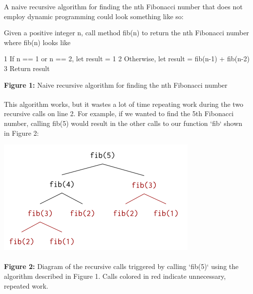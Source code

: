 \documentclass[12pt,letterpaper]{article}
\begin{document}
A naive recursive algorithm for finding the nth Fibonacci number that does not employ dynamic programming could look something like so:

\begin{small}
    \begin{spverbatim}
    Given a positive integer n, call method fib(n) to   
    return the nth Fibonacci number where fib(n) looks like

    1	If n ==  1 or n == 2, let result = 1
    2	Otherwise, let result = fib(n-1) + fib(n-2)
    3	Return result
    \end{spverbatim}
\end{small}

\begin{footnotesize}
    \textbf{Figure 1:} Naive recursive algorithm for finding the nth Fibonacci number
\end{footnotesize}
\paragraph{}

This algorithm works, but it wastes a lot of time repeating work during the two recursive calls on line 2. For example, if we wanted to find the 5th Fibonacci number, calling fib(5) would result in the other calls to our function `fib` shown in Figure 2:

\includegraphics[scale=0.65]{images/fig2fib.png}
\paragraph{}
\begin{footnotesize}
    \noindent\textbf{Figure 2:} Diagram of the recursive calls triggered by calling `fib(5)` using the algorithm described in Figure 1. Calls colored in red indicate unnecessary, repeated work.
\end{footnotesize}
\paragraph{}
\end{document}
